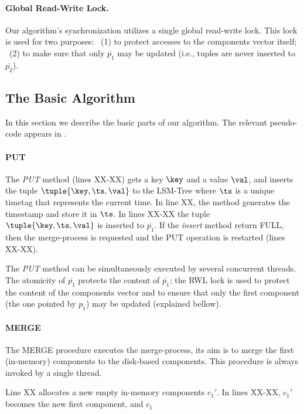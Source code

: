 \paragraph{Global Read-Write Lock.}
Our algorithm's synchronization  utilizes a single global read-write lock.
This lock is used for two purposes:
~(1) to protect accesses to the components vector itself;
~(2) to make sure that only $\overline{p_1}$ may be updated (i.e., tuples are never inserted to $\overline{p_2}$).



\subsection{The Basic Algorithm}

In this section we describe the basic parts of our algorithm.
The relevant pseudo-code appears in .

\paragraph{PUT}
The \emph{PUT} method (lines XX-XX) gets a key $\key$ and a value $\val$,
and inserts the  tuple $\tuple{\key,\ts,\val}$ to the LSM-Tree where $\ts$ is a unique timetag that represents the current time.
In line XX, the method generates the timestamp and store it in $\ts$.
In lines XX-XX the tuple $\tuple{\key,\ts,\val}$ is inserted to $\overline{p_1}$.
%
If the \emph{insert} method return FULL, then the merge-process is requested and the PUT operation is restarted (lines XX-XX).
%

The \emph{PUT} method can be simultaneously executed by several concurrent threads.
The atomicity of $\overline{p_1}$ protects the content of $\overline{p_1}$;
the RWL lock is used to protect the content of the components vector and to ensure that only the first component (the one pointed by $p_1$) may be updated (explained bellow).

\paragraph{MERGE}
\demonsmarker
The MERGE procedure executes the merge-process, its aim is to merge the first (in-memory) components to the disk-based components.
This procedure is always invoked by a single thread.

Line XX allocates a new empty in-memory components $c_1'$.
In lines XX-XX, $c_1'$ becomes the new first component, and $c_1$





